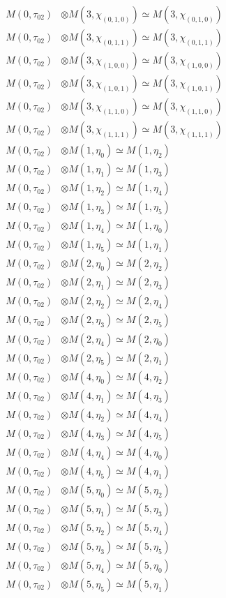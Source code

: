 \begin{align*}
M(0,\tau_{02}) &\otimes M(3,\chi_{(0,1,0)}) \simeq M(3,\chi_{(0,1,0)}) \\
M(0,\tau_{02}) &\otimes M(3,\chi_{(0,1,1)}) \simeq M(3,\chi_{(0,1,1)}) \\
M(0,\tau_{02}) &\otimes M(3,\chi_{(1,0,0)}) \simeq M(3,\chi_{(1,0,0)}) \\
M(0,\tau_{02}) &\otimes M(3,\chi_{(1,0,1)}) \simeq M(3,\chi_{(1,0,1)}) \\
M(0,\tau_{02}) &\otimes M(3,\chi_{(1,1,0)}) \simeq M(3,\chi_{(1,1,0)}) \\
M(0,\tau_{02}) &\otimes M(3,\chi_{(1,1,1)}) \simeq M(3,\chi_{(1,1,1)}) \\
M(0,\tau_{02}) &\otimes M(1,\eta_{0}) \simeq M(1,\eta_{2}) \\
M(0,\tau_{02}) &\otimes M(1,\eta_{1}) \simeq M(1,\eta_{3}) \\
M(0,\tau_{02}) &\otimes M(1,\eta_{2}) \simeq M(1,\eta_{4}) \\
M(0,\tau_{02}) &\otimes M(1,\eta_{3}) \simeq M(1,\eta_{5}) \\
M(0,\tau_{02}) &\otimes M(1,\eta_{4}) \simeq M(1,\eta_{0}) \\
M(0,\tau_{02}) &\otimes M(1,\eta_{5}) \simeq M(1,\eta_{1}) \\
M(0,\tau_{02}) &\otimes M(2,\eta_{0}) \simeq M(2,\eta_{2}) \\
M(0,\tau_{02}) &\otimes M(2,\eta_{1}) \simeq M(2,\eta_{3}) \\
M(0,\tau_{02}) &\otimes M(2,\eta_{2}) \simeq M(2,\eta_{4}) \\
M(0,\tau_{02}) &\otimes M(2,\eta_{3}) \simeq M(2,\eta_{5}) \\
M(0,\tau_{02}) &\otimes M(2,\eta_{4}) \simeq M(2,\eta_{0}) \\
M(0,\tau_{02}) &\otimes M(2,\eta_{5}) \simeq M(2,\eta_{1}) \\
M(0,\tau_{02}) &\otimes M(4,\eta_{0}) \simeq M(4,\eta_{2}) \\
M(0,\tau_{02}) &\otimes M(4,\eta_{1}) \simeq M(4,\eta_{3}) \\
M(0,\tau_{02}) &\otimes M(4,\eta_{2}) \simeq M(4,\eta_{4}) \\
M(0,\tau_{02}) &\otimes M(4,\eta_{3}) \simeq M(4,\eta_{5}) \\
M(0,\tau_{02}) &\otimes M(4,\eta_{4}) \simeq M(4,\eta_{0}) \\
M(0,\tau_{02}) &\otimes M(4,\eta_{5}) \simeq M(4,\eta_{1}) \\
M(0,\tau_{02}) &\otimes M(5,\eta_{0}) \simeq M(5,\eta_{2}) \\
M(0,\tau_{02}) &\otimes M(5,\eta_{1}) \simeq M(5,\eta_{3}) \\
M(0,\tau_{02}) &\otimes M(5,\eta_{2}) \simeq M(5,\eta_{4}) \\
M(0,\tau_{02}) &\otimes M(5,\eta_{3}) \simeq M(5,\eta_{5}) \\
M(0,\tau_{02}) &\otimes M(5,\eta_{4}) \simeq M(5,\eta_{0}) \\
M(0,\tau_{02}) &\otimes M(5,\eta_{5}) \simeq M(5,\eta_{1}) \\
\end{align*}

